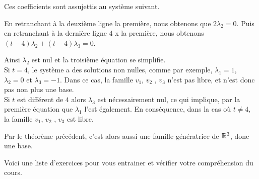 \change
Ces coefficients sont assujettis au système suivant.

\change
En retranchant à la deuxième ligne la première, nous obtenons que $2\lambda_2 = 0$. Puis en retranchant à la dernière ligne 4 x la première, nous obtenons 
$(t-4)\lambda_2 + (t-4) \lambda_3 = 0$.

\change
Ainsi $\lambda_2$ est nul et la troisième équation se simplifie. \\

Si $t=4$, le système a des solutions non nulles, comme par exemple, $\lambda_1 = 1$, $\lambda_2 = 0$ et $\lambda_3 = -1$. Dans ce cas, la famille $v_1$, $v_2$ , $v_3$ n'est pas libre, et n'est donc pas non plus une base.\\


Si $t$ est différent de $4$ alors $\lambda_3$ est nécessairement nul, ce qui implique, par la première équation que $\lambda_1$ l'est également. En conséquence, dans la cas o\`u $t\neq4$, la famille $v_1$, $v_2$ , $v_3$  est libre.

\change
Par le théorème précédent, c'est alors aussi une famille génératrice de $\mathbb{R}^3$, donc une base.
    

\diapo
Voici une liste d'exercices pour vous entrainer et vérifier votre compréhension du cours.



